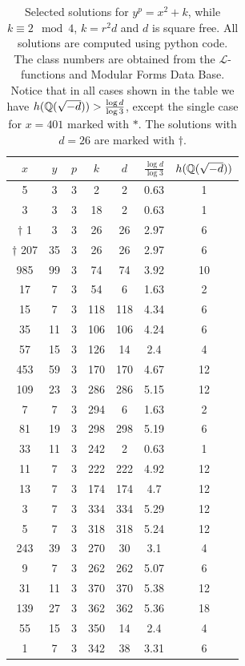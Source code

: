 \begin{table}
\centering 
\caption{Selected solutions for $y^p = x^2 + k$, while $k \equiv 2 \mod 4$, $k= r^2 d$ and $d$ is square free.
All solutions are computed using python code.
The class numbers are obtained from the $\mathcal{L}$-functions and Modular Forms Data Base\cite{lmfdb}.
Notice that in all cases shown in the table we have $h(\mathbb{Q}(\sqrt{-d})) > \frac{\log d}{\log 3}$, except the single case for $x=401$ marked with $*$. 
The solutions with $d=26$ are marked with $\dagger$.
}
\begin{tabular}{cccc|ccc} 
	\hline
	$x$ & $y$ & $p$ & $k$ & $d$ & $\frac{\log d}{\log 3}$ & $h(\mathbb{Q}(\sqrt{-d}))$ \\
	\hline
	        5 & 3 & 3 & 2 & 2 & 0.63 & 1 \\
       3 & 3 & 3 & 18 & 2 & 0.63 & 1 \\
	   \hline
      $\dagger$ 1 & 3 & 3 & 26 & 26 & 2.97 & 6 \\
   $\dagger$ 207 & 35 & 3 & 26 & 26 & 2.97 & 6 \\
	   \hline
  985 & 99 & 3 & 74 & 74 & 3.92 & 10 \\
      17 & 7 & 3 & 54 & 6 & 1.63 & 2 \\
   15 & 7 & 3 & 118 & 118 & 4.34 & 6 \\
  35 & 11 & 3 & 106 & 106 & 4.24 & 6 \\
    57 & 15 & 3 & 126 & 14 & 2.4 & 4 \\
453 & 59 & 3 & 170 & 170 & 4.67 & 12 \\
109 & 23 & 3 & 286 & 286 & 5.15 & 12 \\
      7 & 7 & 3 & 294 & 6 & 1.63 & 2 \\
  81 & 19 & 3 & 298 & 298 & 5.19 & 6 \\
    33 & 11 & 3 & 242 & 2 & 0.63 & 1 \\
  11 & 7 & 3 & 222 & 222 & 4.92 & 12 \\
   13 & 7 & 3 & 174 & 174 & 4.7 & 12 \\
   3 & 7 & 3 & 334 & 334 & 5.29 & 12 \\
   5 & 7 & 3 & 318 & 318 & 5.24 & 12 \\
   243 & 39 & 3 & 270 & 30 & 3.1 & 4 \\
    9 & 7 & 3 & 262 & 262 & 5.07 & 6 \\
 31 & 11 & 3 & 370 & 370 & 5.38 & 12 \\
139 & 27 & 3 & 362 & 362 & 5.36 & 18 \\
    55 & 15 & 3 & 350 & 14 & 2.4 & 4 \\
     1 & 7 & 3 & 342 & 38 & 3.31 & 6 \\

\end{tabular}
\end{table}
